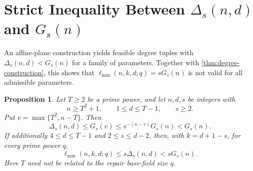 \documentclass[11pt,onecolumn]{IEEEtran}
\newtheorem{proposition}{Proposition}
\newcommand{\ellmin}{\ell_{\min}}
\begin{document}
\section{Strict Inequality Between
\texorpdfstring{$\Delta_s(n,d)$}{Delta\_s(n,d)} and
\texorpdfstring{$G_s(n)$}{G\_s(n)}}
\label{app:affine-obstruction}

An affine-plane construction yields feasible degree tuples with
$\Delta_s(n,d)<G_s(n)$ for a family of parameters.
Together with \cref{thm:degree-construction}, this shows that
$\ellmin(n,k,d;q)=sG_s(n)$ is not valid for all admissible parameters.

\begin{proposition}
\label{prop:affine-plane-obstruction}
Let $T\ge2$ be a prime power, and let $n,d,s$ be integers with
\[
n\ge T^2+1,\qquad 1\le d\le T-1,\qquad s\ge2.
\]
Put $v=\max\{T^2,n-T\}$. Then
\begin{equation}
\label{eq:affine-obstruction-arithmetic}
\Delta_s(n,d)\le G_s(v)
\le s^{-(n-v)}G_s(n)<G_s(n).
\end{equation}
If additionally $4\le d\le T-1$ and $2\le s\le d-2$,
then, with $k=d+1-s$, for every prime power $q$,
\begin{equation}
\label{eq:affine-obstruction-coding}
\ellmin(n,k,d;q)\le s\Delta_s(n,d)<sG_s(n).
\end{equation}
Here $T$ need not be related to the repair base-field size $q$.
\end{proposition}
\end{document}
